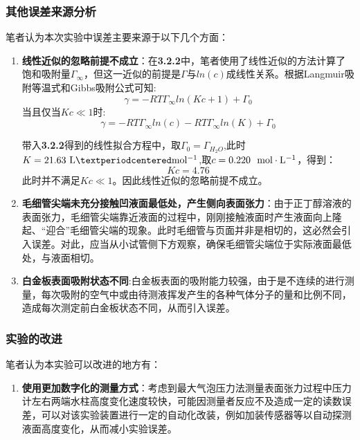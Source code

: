 \documentclass[12pt]{article}
\begin{document}
			\subsubsection{其他误差来源分析}
			笔者认为本次实验中误差主要来源于以下几个方面：
			\begin{enumerate}
				\item \textbf{线性近似的忽略前提不成立}：在\textbf{3.2.2}中，笔者使用了线性近似的方法计算了饱和吸附量$\Gamma_{\infty}$，但这一近似的前提是$\Gamma$与$ln(c)$成线性关系。根据Langmuir吸附等温式和Gibbs吸附公式可知:
				$$\gamma = -RT\Gamma_{\infty}ln(Kc+1)+\Gamma_{0}$$
				当且仅当$Kc\ll 1$时:
				$$\gamma = -RT\Gamma_{\infty}ln(c)-RT\Gamma_{\infty}ln(K)+\Gamma_{0}$$\par 
				带入\textbf{3.2.2}得到的线性拟合方程中，取$\Gamma_{0} = \Gamma_{H_{2}O}$,此时$K = 21.63\ {\rm L·mol^{-1}}$,取$c=0.220\ \ {\rm mol\cdot L^{-1}}$，得到：
				$$Kc=4.76$$
				此时并不满足$Kc\ll 1$。因此线性近似的忽略前提不成立。\par
				\item \textbf{毛细管尖端未充分接触凹液面最低处，产生侧向表面张力}：由于正丁醇溶液的表面张力，毛细管尖端靠近液面的过程中，刚刚接触液面时产生液面向上隆起、“迎合”毛细管尖端的现象。此时毛细管与页面并非是相切的，这必然会引入误差。对此，应当从小试管侧下方观察，确保毛细管尖端位于实际液面最低处，与液面相切。\par
				\item \textbf{白金板表面吸附状态不同}:白金板表面的吸附能力较强，由于是不连续的进行测量，每次吸附的空气中或由待测液挥发产生的各种气体分子的量和比例不同，造成每次测定前白金板状态不同，从而引入误差。\par
			\end{enumerate}
			\subsubsection{实验的改进}
			笔者认为本实验可以改进的地方有：
			\begin{enumerate}
				\item \textbf{使用更加数字化的测量方式}：考虑到最大气泡压力法测量表面张力过程中压力计左右两端水柱高度变化速度较快，可能因测量者反应不及造成一定的读数误差，可以对该实验装置进行一定的自动化改装，例如加装传感器等以自动探测液面高度变化，从而减小实验误差。 \par
			\end{enumerate}
\end{document}
